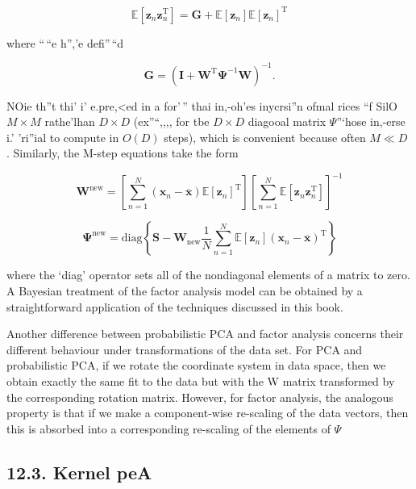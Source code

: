 \documentclass[
  10
]{article}
\begin{document}
\[
{\mathbb {E} [ \mathbf {z} _ {n} \mathbf {z} _ {n} ^ {\mathrm{T}} ]} = {\mathbf {G} + \mathbb {E} [ \mathbf {z} _ {n} ] \mathbb {E} [ \mathbf {z} _ {n} ] ^ {\mathrm{T}}}\tag{12.67}
\]

where ``\,``e h'','e defi''\,``d

\[
\mathbf {G} = (\mathbf {I} + \mathbf {W} ^ {\mathrm{T}} \boldsymbol {\Psi} ^ {- 1} \mathbf {W}) ^ {- 1}.\tag{12.68}
\]

NOie th''t thi' i' e.pre,\textless ed in a for'\,'' thai in,-oh'es
inycrsi''n ofmal rices ``f SilO \(M \times M\) rathe'lhan \(D \times D\)
(ex''``,,,, for tbe \(D \times D\) diagooal matrix \(\Psi\)''`hose
in,-erse i.' 'ri''ial to compute in \(O ( D )\) steps), which is
convenient because often \(M \ll D\) . Similarly, the M-step equations
take the form

\[
{\mathbf {W} ^ {\mathrm{new}}} = {\left[ \sum_ {n = 1} ^ {N} (\mathbf {x} _ {n} - \overline {{\mathbf {x}}}) \mathbb {E} [ \mathbf {z} _ {n} ] ^ {\mathrm{T}} \right] \left[ \sum_ {n = 1} ^ {N} \mathbb {E} [ \mathbf {z} _ {n} \mathbf {z} _ {n} ^ {\mathrm{T}} ] \right] ^ {- 1}}\tag{12.69}
\]

\[
{\boldsymbol {\Psi} ^ {\mathrm{new}}} = {\mathrm{diag} \left\{\mathbf {S} - \mathbf {W} _ {\mathrm{new}} \frac {1}{N} \sum_ {n = 1} ^ {N} \mathbb {E} [ \mathbf {z} _ {n} ] (\mathbf {x} _ {n} - \overline {{{\mathbf {x}}}}) ^ {\mathrm{T}} \right\}}\tag{12.70}
\]

where the `diag' operator sets all of the nondiagonal elements of a
matrix to zero. A Bayesian treatment of the factor analysis model can be
obtained by a straightforward application of the techniques discussed in
this book.

Another difference between probabilistic PCA and factor analysis
concerns their different behaviour under transformations of the data
set. For PCA and probabilistic PCA, if we rotate the coordinate system
in data space, then we obtain exactly the same fit to the data but with
the W matrix transformed by the corresponding rotation matrix. However,
for factor analysis, the analogous property is that if we make a
component-wise re-scaling of the data vectors, then this is absorbed
into a corresponding re-scaling of the elements of \(\Psi\)

\subsection{12.3. Kernel peA}\label{kernel-pea}
\end{document}

